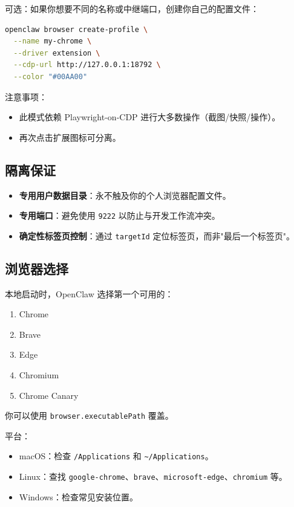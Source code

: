 可选：如果你想要不同的名称或中继端口，创建你自己的配置文件：

\begin{lstlisting}[language=bash]
openclaw browser create-profile \
  --name my-chrome \
  --driver extension \
  --cdp-url http://127.0.0.1:18792 \
  --color "#00AA00"
\end{lstlisting}


注意事项：

\begin{itemize}
  \item 此模式依赖 Playwright-on-CDP 进行大多数操作（截图/快照/操作）。
  \item 再次点击扩展图标可分离。
\end{itemize}


\subsection{隔离保证}


\begin{itemize}
  \item \textbf{专用用户数据目录}：永不触及你的个人浏览器配置文件。
  \item \textbf{专用端口}：避免使用 \texttt{9222} 以防止与开发工作流冲突。
  \item \textbf{确定性标签页控制}：通过 \texttt{targetId} 定位标签页，而非"最后一个标签页"。
\end{itemize}


\subsection{浏览器选择}


本地启动时，OpenClaw 选择第一个可用的：

\begin{enumerate}
  \item Chrome
  \item Brave
  \item Edge
  \item Chromium
  \item Chrome Canary
\end{enumerate}


你可以使用 \texttt{browser.executablePath} 覆盖。

平台：

\begin{itemize}
  \item macOS：检查 \texttt{/Applications} 和 \texttt{\textasciitilde{}/Applications}。
  \item Linux：查找 \texttt{google-chrome}、\texttt{brave}、\texttt{microsoft-edge}、\texttt{chromium} 等。
  \item Windows：检查常见安装位置。
\end{itemize}


